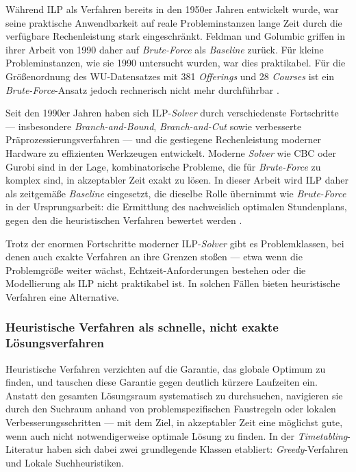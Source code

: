 Während ILP als Verfahren bereits in den 1950er Jahren entwickelt wurde, war seine praktische Anwendbarkeit auf reale Probleminstanzen lange Zeit durch die verfügbare Rechenleistung stark eingeschränkt. Feldman und Golumbic griffen in ihrer Arbeit von 1990 daher auf \textit{Brute-Force} als \textit{Baseline} zurück. Für kleine Probleminstanzen, wie sie 1990 untersucht wurden, war dies praktikabel. Für die Größenordnung des WU-Datensatzes mit 381 \textit{Offerings} und 28 \textit{Courses} ist ein \textit{Brute-Force}-Ansatz jedoch rechnerisch nicht mehr durchführbar \cite{bixby2012brief,newman-2013}.

Seit den 1990er Jahren haben sich ILP-\textit{Solver} durch verschiedenste Fortschritte --- insbesondere \textit{Branch-and-Bound}, \textit{Branch-and-Cut} sowie verbesserte Präprozessierungsverfahren --- und die gestiegene Rechenleistung moderner Hardware zu effizienten Werkzeugen entwickelt. Moderne \textit{Solver} wie CBC oder Gurobi sind in der Lage, kombinatorische Probleme, die für \textit{Brute-Force} zu komplex sind, in akzeptabler Zeit exakt zu lösen. In dieser Arbeit wird ILP daher als zeitgemäße \textit{Baseline} eingesetzt, die dieselbe Rolle übernimmt wie \textit{Brute-Force} in der Ursprungsarbeit: die Ermittlung des nachweislich optimalen Stundenplans, gegen den die heuristischen Verfahren bewertet werden \cite{clautiaux-2024}.

Trotz der enormen Fortschritte moderner ILP-\textit{Solver} gibt es Problemklassen, bei denen auch exakte Verfahren an ihre Grenzen stoßen --- etwa wenn die Problemgröße weiter wächst, Echtzeit-Anforderungen bestehen oder die Modellierung als ILP nicht praktikabel ist. In solchen Fällen bieten heuristische Verfahren eine Alternative.


\newpage

\subsubsection{Heuristische Verfahren als schnelle, nicht exakte Lösungsverfahren}

Heuristische Verfahren verzichten auf die Garantie, das globale Optimum zu finden, und tauschen diese Garantie gegen deutlich kürzere Laufzeiten ein. Anstatt den gesamten Lösungsraum systematisch zu durchsuchen, navigieren sie durch den Suchraum anhand von problemspezifischen Faustregeln oder lokalen Verbesserungsschritten --- mit dem Ziel, in akzeptabler Zeit eine möglichst gute, wenn auch nicht notwendigerweise optimale Lösung zu finden. In der \textit{Timetabling}-Literatur haben sich dabei zwei grundlegende Klassen etabliert: \textit{Greedy}-Verfahren und Lokale Suchheuristiken.

